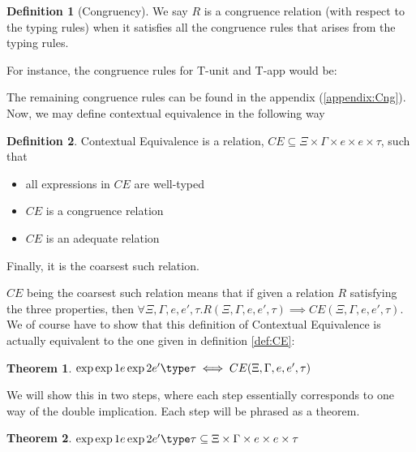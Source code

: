 \documentclass[twoside,11pt,openright]{report}
\newtheorem{theorem}{Theorem}
\theoremstyle{definition}
\newtheorem{definition}{Definition}[section]
\newcommand{\expr}{e}
\newcommand{\TT}{()}
\newcommand{\Tvar}{X}
\newcommand{\Tapp}[1]{#1\;\_}
\newcommand{\subst}[3]{#1{\left[#3 \middle/ #2 \right]}}
\newcommand{\Tunit}{\mathsf{Unit}}
\newcommand{\Tall}[2]{\forall #1.\; #2}
\newcommand{\typ}{\tau}
\newcommand{\venv}{\Gamma}
\newcommand{\tenv}{\Xi}
\def\envscteq#1#2\exp1#3\exp2#4\type#5
\def\envscteqgen#1#2\exp1#3\exp2#4\type#5
\begin{document}
\begin{definition}[Congruency]
  We say $R$ is a congruence relation (with respect to the typing rules) when it satisfies all the congruence rules that arises from the typing rules.
\end{definition}
For instance, the congruence rules for T-unit and T-app would be:
The remaining congruence rules can be found in the appendix (\ref{appendix:Cng}).\\
Now, we may define contextual equivalence in the following way
\begin{definition}\label{def:CE2}
  Contextual Equivalence is a relation, $CE \subseteq \tenv \times \venv \times \expr \times \expr \times \typ$, such that
  \begin{itemize}
    \item all expressions in $CE$ are well-typed
    \item $CE$ is a congruence relation
    \item $CE$ is an adequate relation
  \end{itemize}
  Finally, it is the coarsest such relation.
\end{definition}
$CE$ being the coarsest such relation means that if given a relation $R$ satisfying the three properties, then $\forall \tenv, \venv, \expr, \expr', \typ . R(\tenv, \venv, \expr, \expr', \typ) \implies CE(\tenv, \venv, \expr, \expr', \typ)$.\\
We of course have to show that this definition of Contextual Equivalence is actually equivalent to the one given in definition \ref{def:CE}:
\begin{theorem}\label{thm:CE_eq}
  $\envscteq \tenv \venv \exp1 \expr \exp2 \expr' \type \typ \iff CE(\tenv, \venv, \expr, \expr', \typ)$
\end{theorem}
We will show this in two steps, where each step essentially corresponds to one way of the double implication. Each step will be phrased as a theorem.
\begin{theorem}\label{thm:CE_eq_part1}
  $\envscteq \tenv \venv \exp1 \expr \exp2 \expr' \type \typ \subseteq \tenv \times \venv \times \expr \times \expr \times \typ$\\
\end{theorem}
\end{document}
